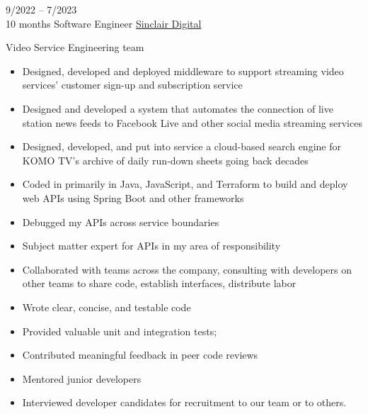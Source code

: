 \documentclass[9pt]{developercv} %
\begin{document}
\begin{entrylist}
	\entry
        {9/2022 -- 7/2023 \\\footnotesize{10 months}}
		{Software Engineer}
		{\href{https://sinclairdigital.com/}{Sinclair Digital}}
		{
        Video Service Engineering team
        \begin{itemize}[noitemsep,topsep=0pt,parsep=0pt,partopsep=0pt, leftmargin=-1pt]
            \item Designed, developed and deployed middleware to support streaming video services’ customer sign-up and subscription service
            \item Designed and developed a system that automates the connection of live station news feeds to Facebook Live and other social media streaming services
            \item Designed, developed, and put into service a cloud-based search engine for KOMO TV’s archive of daily run-down sheets going back decades
            \item Coded in primarily in Java, JavaScript, and Terraform to build and deploy web APIs using Spring Boot and other frameworks
            \item Debugged my APIs across service boundaries
            \item Subject matter expert for APIs in my area of responsibility
            \item Collaborated with teams across the company, consulting with developers on other teams to share code, establish interfaces, distribute labor
            \item Wrote clear, concise, and testable code
            \item Provided valuable unit and integration tests;
            \item Contributed meaningful feedback in peer code reviews
            \item Mentored junior developers
            \item Interviewed developer candidates for recruitment to our team or to others.
        \end{itemize}}


\end{entrylist}
\end{document}
